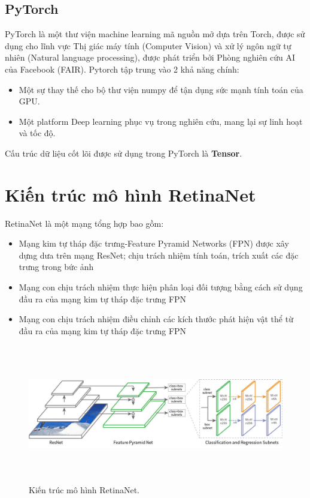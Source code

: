 \documentclass[a4paper, 12pt]{report}
\begin{document}
\subsection{PyTorch}
PyTorch là một thư viện machine learning mã nguồn mở dựa trên Torch, được sử dụng cho lĩnh vực Thị giác máy tính (Computer Vision) và xử lý ngôn ngữ tự nhiên (Natural language processing), được phát triển bởi Phòng nghiên cứu AI của Facebook (FAIR). Pytorch tập trung vào 2 khả năng chính:
\begin{itemize}
	\item Một sự thay thế cho bộ thư viện numpy để tận dụng sức mạnh tính toán của GPU.
	\item Một platform Deep learning phục vụ trong nghiên cứu, mang lại sự linh hoạt và tốc độ.
\end{itemize}
Cấu trúc dữ liệu cốt lõi được sử dụng trong PyTorch là \textbf{Tensor}.\par

\section{Kiến trúc mô hình RetinaNet}
RetinaNet là một mạng tổng hợp bao gồm:
\begin{itemize}
	\item Mạng kim tự tháp đặc trưng-Feature Pyramid Networks (FPN) được xây dựng dưa trên mạng ResNet; chịu trách nhiệm tính toán,  trích xuất các đặc trưng trong bức ảnh
	\item Mạng con chịu trách nhiệm thực hiện phân loại đối tượng bằng cách sử dụng đầu ra của mạng kim tự tháp đặc trưng FPN
	\item Mạng con chịu trách nhiệm điều chỉnh các kích thước phát hiện vật thể từ đầu ra của mạng kim tự tháp đặc trưng FPN
\end{itemize}
\begin{figure}[!h]
	\centering
	\includegraphics[width=12cm,height=6cm]{Images/resnet_visulize}
	\caption{Kiến trúc mô hình RetinaNet.}
	\label{fig:resnet-fpn4}
\end{figure}
\end{document}
